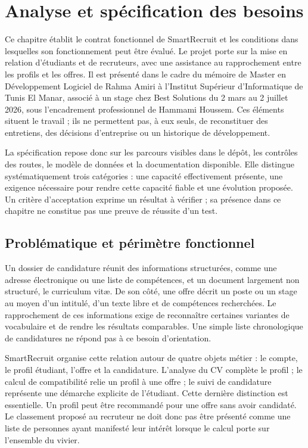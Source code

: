 \chapter{Analyse et spécification des besoins}
\label{chap:besoins}

Ce chapitre établit le contrat fonctionnel de SmartRecruit et les conditions dans lesquelles son fonctionnement peut être évalué. Le projet porte sur la mise en relation d'étudiants et de recruteurs, avec une assistance au rapprochement entre les profils et les offres. Il est présenté dans le cadre du mémoire de Master en Développement Logiciel de Rahma Amiri à l'Institut Supérieur d'Informatique de Tunis El Manar, associé à un stage chez Best Solutions du 2 mars au 2 juillet 2026, sous l'encadrement professionnel de Hammami Houssem. Ces éléments situent le travail ; ils ne permettent pas, à eux seuls, de reconstituer des entretiens, des décisions d'entreprise ou un historique de développement.

La spécification repose donc sur les parcours visibles dans le dépôt, les contrôles des routes, le modèle de données et la documentation disponible. Elle distingue systématiquement trois catégories : une capacité effectivement présente, une exigence nécessaire pour rendre cette capacité fiable et une évolution proposée. Un critère d'acceptation exprime un résultat à vérifier ; sa présence dans ce chapitre ne constitue pas une preuve de réussite d'un test.

\section{Problématique et périmètre fonctionnel}

Un dossier de candidature réunit des informations structurées, comme une adresse électronique ou une liste de compétences, et un document largement non structuré, le curriculum vitæ. De son côté, une offre décrit un poste ou un stage au moyen d'un intitulé, d'un texte libre et de compétences recherchées. Le rapprochement de ces informations exige de reconnaître certaines variantes de vocabulaire et de rendre les résultats comparables. Une simple liste chronologique de candidatures ne répond pas à ce besoin d'orientation.

SmartRecruit organise cette relation autour de quatre objets métier : le compte, le profil étudiant, l'offre et la candidature. L'analyse du CV complète le profil ; le calcul de compatibilité relie un profil à une offre ; le suivi de candidature représente une démarche explicite de l'étudiant. Cette dernière distinction est essentielle. Un profil peut être recommandé pour une offre sans avoir candidaté. Le classement proposé au recruteur ne doit donc pas être présenté comme une liste de personnes ayant manifesté leur intérêt lorsque le calcul porte sur l'ensemble du vivier.

